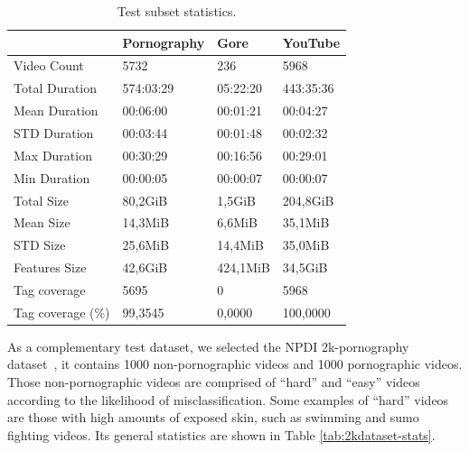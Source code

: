 \begin{table}
\centering
\caption{Test subset statistics.}
\begin{tabular}{l|l|l|l}
                  & Pornography & Gore     & YouTube   \\ \hline
Video Count       & 5732        & 236      & 5968      \\ \hline
Total Duration    & 574:03:29   & 05:22:20 & 443:35:36 \\ \hline
Mean Duration     & 00:06:00    & 00:01:21 & 00:04:27  \\ \hline
STD Duration      & 00:03:44    & 00:01:48 & 00:02:32  \\ \hline
Max Duration      & 00:30:29    & 00:16:56 & 00:29:01  \\ \hline
Min Duration      & 00:00:05    & 00:00:07 & 00:00:07  \\ \hline
Total Size        & 80,2GiB     & 1,5GiB   & 204,8GiB  \\ \hline
Mean Size         & 14,3MiB     & 6,6MiB   & 35,1MiB   \\ \hline
STD Size          & 25,6MiB     & 14,4MiB  & 35,0MiB   \\ \hline
Features Size     & 42,6GiB     & 424,1MiB & 34,5GiB   \\ \hline
Tag coverage      & 5695        & 0        & 5968      \\ \hline
Tag coverage (\%) & 99,3545     & 0,0000   & 100,0000 
\end{tabular}
\label{tab:subset-stats}
\end{table}

As a complementary test dataset, we selected the NPDI 2k-pornography dataset~\cite{avila2013pooling}, it contains 1000 non-pornographic videos and 1000 pornographic videos. Those non-pornographic videos are comprised of ``hard'' and ``easy'' videos according to the likelihood of misclassification. Some examples of ``hard'' videos are those with high amounts of exposed skin, such as swimming and sumo fighting videos. Its general statistics are shown in Table \ref{tab:2kdataset-stats}.

